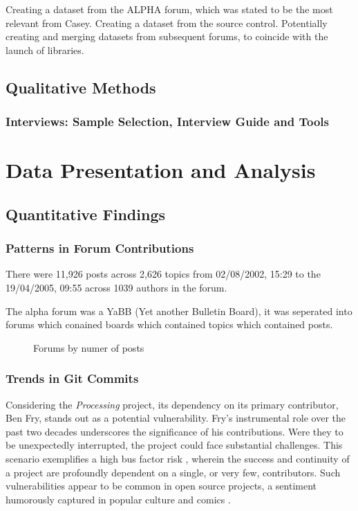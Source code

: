 \documentclass{article}
\begin{document}
Creating a dataset from the ALPHA forum, which was stated to be the most relevant from Casey.
Creating a dataset from the source control.
Potentially creating and merging datasets from subsequent forums, to coincide with the launch of libraries.

\subsection{Qualitative Methods}
\subsubsection{Interviews: Sample Selection, Interview Guide and Tools}


\section{Data Presentation and Analysis}

\subsection{Quantitative Findings}

\subsubsection{Patterns in Forum Contributions}
There were 11,926 posts across 2,626 topics from 02/08/2002, 15:29 to the 19/04/2005, 09:55 across 1039 authors in the forum.

The alpha forum was a YaBB (Yet another Bulletin Board), it was seperated into forums which conained boards which contained topics which contained posts.

\begin{figure}[h!] 
  \centering
  
  \caption{Forums by numer of posts}
  \label{fig:forums}  
\end{figure}

\subsubsection{Trends in Git Commits}

Considering the \textit{Processing} project, its dependency on its primary contributor, Ben Fry, stands out as a potential vulnerability. Fry's instrumental role over the past two decades underscores the significance of his contributions. Were they to be unexpectedly interrupted, the project could face substantial challenges. This scenario exemplifies a high bus factor risk \parencite{BusFactor2023}, wherein the success and continuity of a project are profoundly dependent on a single, or very few, contributors. Such vulnerabilities appear to be common in open source projects, a sentiment humorously captured in popular culture and comics \parencite{munroeDependency2020}.
\end{document}
